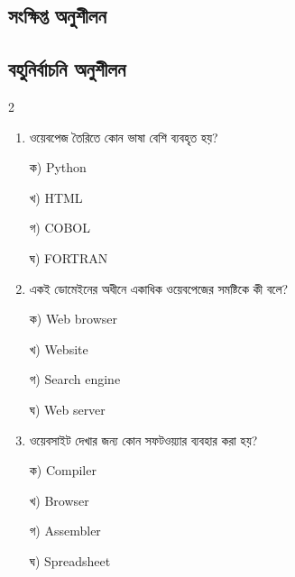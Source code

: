 \subsection{সংক্ষিপ্ত অনুশীলন}




\subsection{বহুনির্বাচনি অনুশীলন}

\begin{multicols}{2}
\begin{enumerate}[leftmargin=*,itemsep=5pt]
\item \begin{minipage}[t]{\linewidth}\vspace{0pt}
ওয়েবপেজ তৈরিতে কোন ভাষা বেশি ব্যবহৃত হয়?
\par ক) Python
\par খ) HTML
\par গ) COBOL
\par ঘ) FORTRAN\\
\end{minipage}

\item \begin{minipage}[t]{\linewidth}\vspace{0pt}
একই ডোমেইনের অধীনে একাধিক ওয়েবপেজের সমষ্টিকে কী বলে?
\par ক) Web browser
\par খ) Website
\par গ) Search engine
\par ঘ) Web server\\
\end{minipage}

\item \begin{minipage}[t]{\linewidth}\vspace{0pt}
ওয়েবসাইট দেখার জন্য কোন সফটওয়্যার ব্যবহার করা হয়?
\par ক) Compiler
\par খ) Browser
\par গ) Assembler
\par ঘ) Spreadsheet\\
\end{minipage}


\end{enumerate}
\end{multicols}
